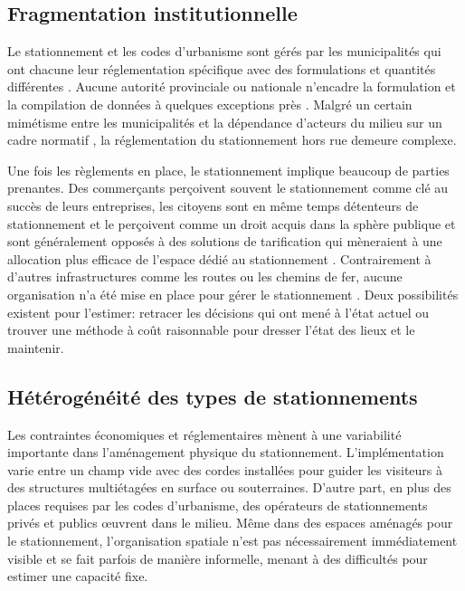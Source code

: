 \subsection{Fragmentation institutionnelle}
Le stationnement et les codes d'urbanisme sont gérés par les municipalités qui ont chacune leur réglementation spécifique avec des formulations et quantités différentes \parencite{goodman_graphing_2015}. Aucune autorité provinciale ou nationale n'encadre la formulation et la compilation de données à quelques exceptions près \parencite{department_for_transport_digital_2025,bronin_how_2023}. Malgré un certain mimétisme entre les municipalités \parencite{shoup_high_2005} et la dépendance d'acteurs du milieu sur un cadre normatif \parencite{ite_parking_2023}, la réglementation du stationnement hors rue demeure complexe.\par
Une fois les règlements en place, le stationnement implique beaucoup de parties prenantes. Des commerçants perçoivent souvent le stationnement comme clé au succès de leurs entreprises, les citoyens sont en même temps détenteurs de stationnement et le perçoivent comme un droit acquis dans la sphère publique et sont généralement opposés à des solutions de tarification qui mèneraient à une allocation plus efficace de l'espace dédié au stationnement \parencite{rye_role_2008,de_borger_political_2017,}. Contrairement à d'autres infrastructures comme les routes ou les chemins de fer, aucune organisation n'a été mise en place pour gérer le stationnement \parencite[p. 65]{cohon_measuring_1996}. Deux possibilités existent pour l'estimer: retracer les décisions qui ont mené à l'état actuel ou trouver une méthode à coût raisonnable pour dresser l'état des lieux et le maintenir.

\subsection{Hétérogénéité des types de stationnements}
Les contraintes économiques et réglementaires mènent à une variabilité importante dans l'aménagement physique du stationnement. L'implémentation varie entre un champ vide avec des cordes installées pour guider les visiteurs à des structures multiétagées en surface ou souterraines. D'autre part, en plus des places requises par les codes d'urbanisme, des opérateurs de stationnements privés et publics œuvrent dans le milieu. Même dans des espaces aménagés pour le stationnement, l'organisation spatiale n'est pas nécessairement immédiatement visible et se fait parfois de manière informelle, menant à des difficultés pour estimer une capacité fixe. 

